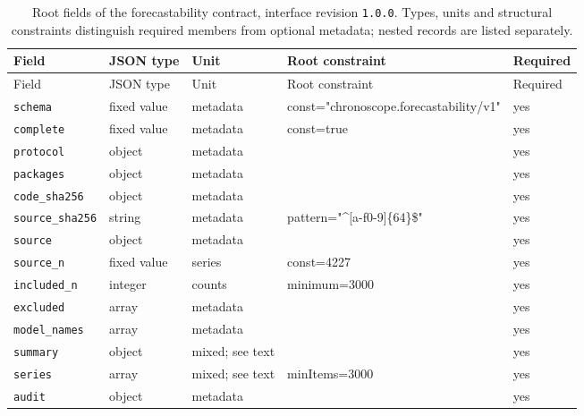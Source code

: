 \begingroup\small
\begin{longtable}{@{}p{}p{}p{}p{}p{}@{}}
\caption{Root fields of the forecastability contract, interface revision \texttt{1.0.0}. Types, units and structural constraints distinguish required members from optional metadata; nested records are listed separately.}\label{tab:contract-forecastability}\\
\toprule Field & JSON type & Unit & Root constraint & Required\\\midrule\endfirsthead
\toprule Field & JSON type & Unit & Root constraint & Required\\\midrule\endhead
\texttt{schema} & fixed value & metadata & const="chronosco\allowbreak{}pe.forecastabili\allowbreak{}ty/v1" & yes\\
\texttt{complete} & fixed value & metadata & const=true & yes\\
\texttt{protocol} & object & metadata &  & yes\\
\texttt{packages} & object & metadata &  & yes\\
\texttt{code\_\allowbreak{}sha256} & object & metadata &  & yes\\
\texttt{source\_\allowbreak{}sha256} & string & metadata & pattern="\textasciicircum{}[a-f0-9]\{64\}\$" & yes\\
\texttt{source} & object & metadata &  & yes\\
\texttt{source\_\allowbreak{}n} & fixed value & series & const=4227 & yes\\
\texttt{included\_\allowbreak{}n} & integer & counts & minimum=3000 & yes\\
\texttt{excluded} & array & metadata &  & yes\\
\texttt{model\_\allowbreak{}names} & array & metadata &  & yes\\
\texttt{summary} & object & mixed; see text &  & yes\\
\texttt{series} & array & mixed; see text & minItems=3000 & yes\\
\texttt{audit} & object & metadata &  & yes\\
\bottomrule
\end{longtable}
\endgroup
